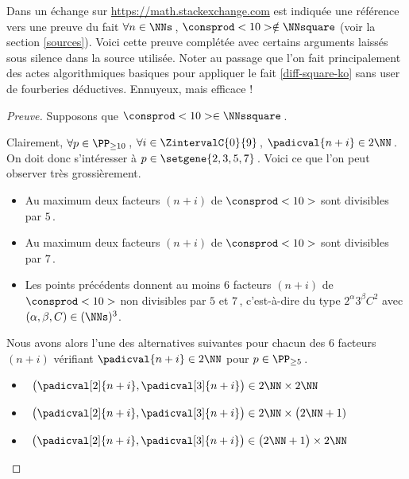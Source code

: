 Dans un échange sur \url{https://math.stackexchange.com} est indiquée une référence vers une preuve du fait $\forall n \in \NNs$\,, $\consprod<10> \notin \NNsquare$ (voir la section \ref{sources}).
Voici cette preuve complétée avec certains arguments laissés sous silence dans la source utilisée.
Noter au passage que l'on fait principalement des actes algorithmiques basiques pour appliquer le fait \ref{diff-square-ko} sans user de fourberies déductives. Ennuyeux, mais efficace !




\begin{proof}[Preuve]%
    Supposons que $\consprod<10> \in \NNssquare$\,.
    
    \smallskip
    
    Clairement, 
    $\forall p \in \PP_{\geq 10}$\,, 
    $\forall i \in \ZintervalC{0}{9}$\,, 
    $\padicval{n + i} \in 2 \NN$\,.
    On doit donc s'intéresser à $p \in \setgene{2, 3, 5, 7}$\,. Voici ce que l'on peut observer très grossièrement.
    \begin{itemize}
		\item Au maximum deux facteurs $(n + i)$ de $\consprod<10>$ sont divisibles par $5$\,.

		\item Au maximum deux facteurs $(n + i)$ de $\consprod<10>$ sont divisibles par $7$\,.

		\item Les points précédents donnent au moins $6$ facteurs $(n + i)$ de $\consprod<10>$ non divisibles par $5$ et $7$\,, c'est-à-dire du type $2^\alpha 3^\beta C^2$ avec $(\alpha, \beta, C) \in ( \NNs )^3$.
    \end{itemize}
    
    Nous avons alors l'une des alternatives suivantes pour chacun des $6$ facteurs $(n+i)$ vérifiant $\padicval{n + i} \in 2 \NN$ pour $p \in \PP_{\geq 5}$\,.
    \begin{itemize}
    	\smallskip
		\item {}\,
		$\big( \padicval[2]{n + i} , \padicval[3]{n + i} \big) \in 2 \NN \times 2 \NN$

    	\smallskip
		\item {}\,
		$\big( \padicval[2]{n + i} , \padicval[3]{n + i} \big) \in 2 \NN \times \big( 2 \NN + 1)$

    	\smallskip
		\item {}\,
		$\big( \padicval[2]{n + i} , \padicval[3]{n + i} \big) \in \big( 2 \NN + 1 \big) \times 2 \NN$


\end{itemize}
\end{proof}
